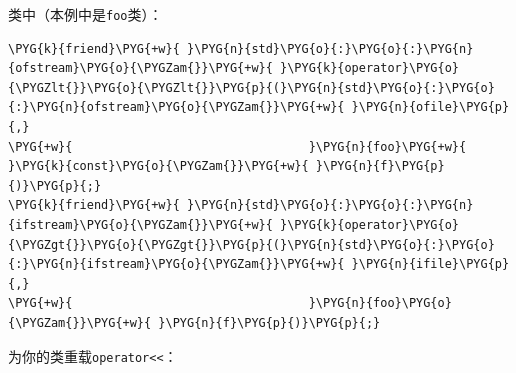 类中（本例中是\texttt{foo}类）：



\begin{codeblockbg}
\begin{Verbatim}[commandchars=\\\{\},breaklines=true,breakanywhere=true,fontsize=\codefont,xleftmargin=17bp]
\PYG{k}{friend}\PYG{+w}{ }\PYG{n}{std}\PYG{o}{:}\PYG{o}{:}\PYG{n}{ofstream}\PYG{o}{\PYGZam{}}\PYG{+w}{ }\PYG{k}{operator}\PYG{o}{\PYGZlt{}}\PYG{o}{\PYGZlt{}}\PYG{p}{(}\PYG{n}{std}\PYG{o}{:}\PYG{o}{:}\PYG{n}{ofstream}\PYG{o}{\PYGZam{}}\PYG{+w}{ }\PYG{n}{ofile}\PYG{p}{,}
\PYG{+w}{                                 }\PYG{n}{foo}\PYG{+w}{ }\PYG{k}{const}\PYG{o}{\PYGZam{}}\PYG{+w}{ }\PYG{n}{f}\PYG{p}{)}\PYG{p}{;}
\PYG{k}{friend}\PYG{+w}{ }\PYG{n}{std}\PYG{o}{:}\PYG{o}{:}\PYG{n}{ifstream}\PYG{o}{\PYGZam{}}\PYG{+w}{ }\PYG{k}{operator}\PYG{o}{\PYGZgt{}}\PYG{o}{\PYGZgt{}}\PYG{p}{(}\PYG{n}{std}\PYG{o}{:}\PYG{o}{:}\PYG{n}{ifstream}\PYG{o}{\PYGZam{}}\PYG{+w}{ }\PYG{n}{ifile}\PYG{p}{,}
\PYG{+w}{                                 }\PYG{n}{foo}\PYG{o}{\PYGZam{}}\PYG{+w}{ }\PYG{n}{f}\PYG{p}{)}\PYG{p}{;}
\end{Verbatim}
\end{codeblockbg}



为你的类重载\texttt{operator<<}：



